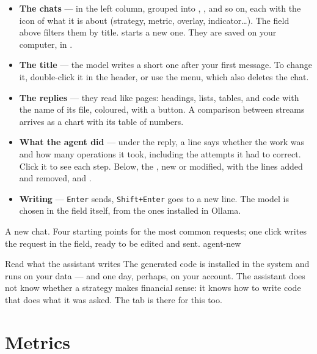 \begin{itemize}
  \item \textbf{The chats} --- in the left column, grouped into
        , ,  and so on,
        each with the icon of what it is about (strategy, metric, overlay,
        indicator\ldots). The field above filters them by title.
         starts a new one. They are saved on your
        computer, in .
  \item \textbf{The title} --- the model writes a short one after your first
        message. To change it, double-click it in the header, or use the
        \voce{\ldots} menu, which also deletes the chat.
  \item \textbf{The replies} --- they read like pages: headings, lists,
        tables, and code with the name of its file, coloured, with a
         button. A comparison between streams arrives as a
        chart with its table of numbers.
  \item \textbf{What the agent did} --- under the reply, a line says whether
        the work was  and how many operations it took,
        including the attempts it had to correct. Click it to see each step.
        Below, the , new or modified, with the lines
        added and removed, and .
  \item \textbf{Writing} --- \texttt{Enter} sends, \texttt{Shift+Enter} goes
        to a new line. The model is chosen in the field itself, from the
        ones installed in Ollama.
\end{itemize}

  {A new chat. Four starting points for the most common requests; one click
   writes the request in the field, ready to be edited and sent.}
  {agent-new}

\begin{attenzione}{Read what the assistant writes}
The generated code is installed in the system and runs on your data --- and
one day, perhaps, on your account. The assistant does not know whether a
strategy makes financial sense: it knows how to write code that does what it
was asked. The  tab is there for this too.
\end{attenzione}

\section{Metrics}\label{sez:studio-metrics}

